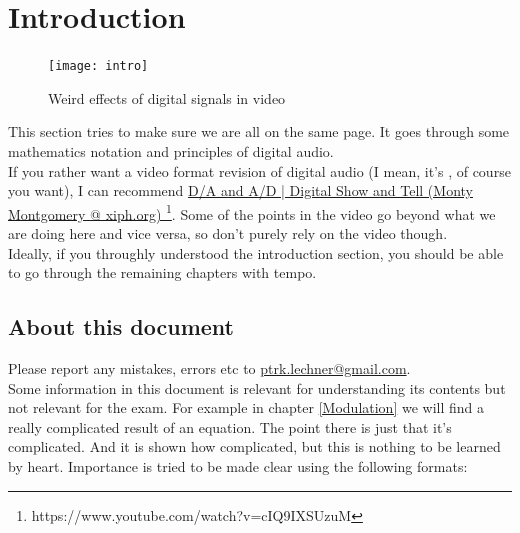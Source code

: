 
\chapter{Introduction}
\label{introduction}

\begin{figure}[h!]
	\centering
	\texttt{[image: intro]}
	\caption[cover]
	{Weird effects of digital signals in video}
	\label{fig:label}
\end{figure}
\clearpage

This section tries to make sure we are all on the same page. It goes through some mathematics notation and principles of digital audio.\\
If you rather want a video format revision of digital audio (I mean, it's \the\year, of course you want), I can recommend \href{https://www.youtube.com/watch?v=cIQ9IXSUzuM}{D/A and A/D | Digital Show and Tell (Monty Montgomery @ xiph.org) }\footnote{https://www.youtube.com/watch?v=cIQ9IXSUzuM}. Some of the points in the video go beyond what we are doing here and vice versa, so don't purely rely on the video though. \\
Ideally, if you throughly understood the introduction section, you should be able to go through the remaining chapters with tempo.\\

\section{About this document}
Please report any mistakes, errors etc to \href{mailto:ptrk.lechner@gmail.com}{ptrk.lechner@gmail.com}.\\

Some information in this document is relevant for understanding its contents but not relevant for the exam. For example in chapter \ref{Modulation} we will find a really complicated result of an equation. The point there is just that it's complicated. And it is shown how complicated, but this is nothing to be learned by heart. Importance is tried to be made clear using the following formats:\\




